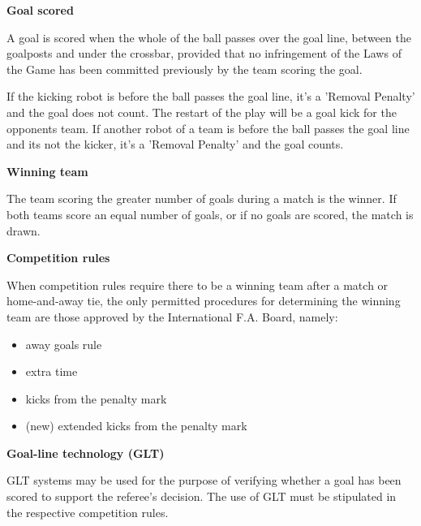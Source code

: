 \clearpage
\sffamily
{\bfseries\color[rgb]{0.4,0.4,0.4}{Law 10 -- The Method of Scoring} }
{}

\bigskip

{\bfseries Goal scored }

\headlinebox

A goal is scored when the whole of the ball passes over the goal line,
between the goalposts and under the crossbar,
provided that no infringement of the Laws of the Game has been committed
previously by the team scoring the goal.

\bigskip

If the kicking robot is   before the ball passes the goal line,
it's a 'Removal Penalty' and the goal does not count.
The restart of the play will be a goal kick for the opponents team.
If another robot of a team is   before the ball
passes the goal line and its not the kicker, it's a 'Removal Penalty' and the goal counts.

\bigskip

{\bfseries Winning team}

\headlinebox

The team scoring the greater number of goals during a match is the winner. If both teams score an equal number of goals, or if no goals are scored, the match is drawn. 

\bigskip

{\bfseries Competition rules }

\headlinebox

When competition rules require there to be a winning team after a match or home-and-away tie, the only permitted procedures for determining the winning team are those approved by the International F.A. Board, namely:

\begin{itemize}
\item away goals rule
\item extra time
\item kicks from the penalty mark
\item (new) extended kicks from the penalty mark
\end{itemize}


{\bfseries Goal-line technology (GLT) }

\headlinebox

GLT systems may be used for the purpose of verifying whether a goal has been scored to support the referee{\textquoteright}s decision. The use of GLT must be stipulated in the respective competition rules.
